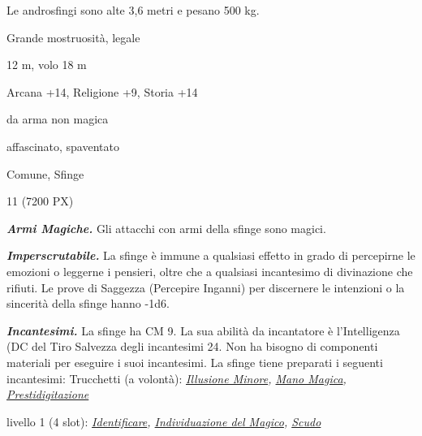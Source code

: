 \begin{multicols}{2}
{Le androsfingi sono alte 3,6 metri e pesano 500 kg.

\begin{description}[noitemsep, topsep=0pt, parsep=0pt, partopsep=0pt, itemsep=1pt, leftmargin=2.35cm,  labelwidth=2.2cm, itemindent=0cm, listparindent=0pt] %
\setlength{\baselineskip}{10pt}
\item[\textbf{Taglia/Tipo}] Grande mostruosità, legale
\item[\textbf{Caratt.}] 
\item[\textbf{Punti Ferita}] 
\item[\textbf{Movimento}] 12 m, volo 18 m
\item[\textbf{Tiri Salvez.}] 
\item[\textbf{Comp.}] Arcana +14, Religione +9, Storia +14
\item[\textbf{Res. Danni}] da arma non magica
\item[\textbf{Immunità}] affascinato, spaventato
\item[\textbf{Sensi}] 
\item[\textbf{Linguaggi}] Comune, Sfinge
\item[\textbf{Sfida}] 11 (7200 PX)
\end{description}
\smallskip

\emph{\textbf{Armi Magiche.}} Gli attacchi con armi della sfinge sono magici.

\emph{\textbf{Imperscrutabile.}} La sfinge è immune a qualsiasi effetto in grado di percepirne le emozioni o leggerne i pensieri, oltre che a qualsiasi incantesimo di divinazione che rifiuti. Le prove di Saggezza (Percepire Inganni) per discernere le intenzioni o la sincerità della sfinge hanno -1d6.

\emph{\textbf{Incantesimi.}} La sfinge ha CM 9. La sua abilità da incantatore è l'Intelligenza (DC del Tiro Salvezza degli incantesimi 24. Non ha bisogno di componenti materiali per eseguire i suoi incantesimi. La sfinge tiene preparati i seguenti incantesimi: Trucchetti (a volontà): \emph{\hyperlink{Illusione Minore}{Illusione Minore}, \hyperlink{Mano Magica}{Mano Magica},} \emph{\hyperlink{Prestidigitazione}{Prestidigitazione}}

livello 1 (4 slot): \emph{\hyperlink{Identificare}{Identificare}, \hyperlink{Individuazione del Magico}{Individuazione del Magico}, \hyperlink{Scudo}{Scudo}}

}
\end{multicols}
